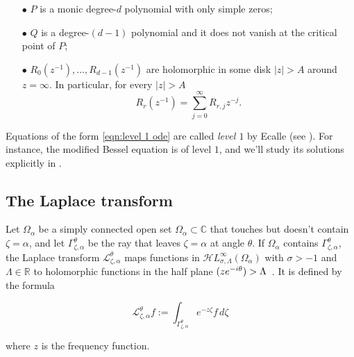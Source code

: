 \documentclass{article}
\theoremstyle{plain}
\newcommand{\R}{\mathbb{R}}
\newcommand{\C}{\mathbb{C}}
\let\Re\relax
\DeclareMathOperator{\Re}{Re}
\newcommand{\laplace}{\mathcal{L}}
\newcommand{\singexp}[2]{\mathcal{H}L^\infty_{#1, #2}}
\newcommand{\domain}{\Omega}
\begin{document}
\begin{enumerate}
\item[$\bullet$] $P$ is a monic degree-$d$ polynomial with only simple zeros; 
\item[$\bullet$] $Q$ is a degree-$(d-1)$ polynomial and it does not vanish at the critical point of $P$;
\item[$\bullet$] $R_0(z^{-1}), \ldots, R_{d-1}(z^{-1})$ are holomorphic in some disk $|z| > A$ around $z = \infty$. In particular, for every $|z|>A$
\[ R_r(z^{-1}) = \sum_{j=0}^\infty R_{r,j} z^{-j}. \]
\end{enumerate}

Equations of the form \eqref{eqn:level 1 ode} are called {\em level $1$} by Ecalle (see \cite[Section 2.1]{EcalleIII}). For instance, the modified Bessel equation is of level $1$, and we'll study its solutions explicitly in \cite{borel_reg}. 

\subsection{The Laplace transform}


Let $\domain_\alpha$ be a simply connected open set $\domain_\alpha\subset\C$ that touches but doesn't contain $\zeta=\alpha$, and let $\Gamma_{\zeta, \alpha}^\theta$ be the ray that leaves $\zeta=\alpha$ at angle $\theta$. If $\domain_\alpha$ contains $\Gamma_{\zeta, \alpha}^\theta$, the Laplace transform $\laplace_{\zeta, \alpha}^{\theta} $ maps functions in $\singexp{\sigma}{\Lambda}(\domain_\alpha)$ with $\sigma>-1$ and $\Lambda\in\R$ to holomorphic functions in the half plane $\Re(z e^{-i\theta}) > \Lambda$~\cite[Section 5.6]{diverg-resurg-i}. It is defined by the formula

\begin{equation}\label{laplace:int} 
\laplace_{\zeta, \alpha}^{\theta} f := \int_{\Gamma_{\zeta,\alpha}^\theta} e^{-z\zeta} f\, d\zeta
\end{equation}

where $z$ is the frequency function. 
\end{document}
